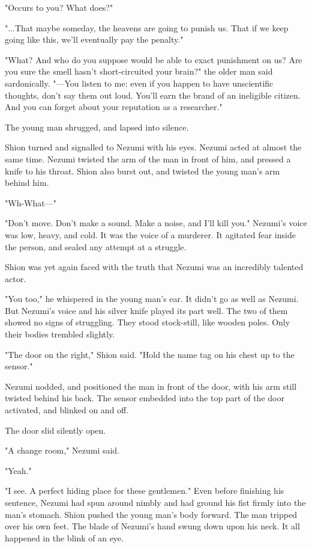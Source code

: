 "Occurs to you? What does?"

"...That maybe someday, the heavens are going to punish us. That if we
keep going like this, we'll eventually pay the penalty."

"What? And who do you suppose would be able to exact punishment on us?
Are you sure the smell hasn't short-circuited your brain?" the older man
said sardonically. "---You listen to me: even if you happen to have
unscientific thoughts, don't say them out loud. You'll earn the brand of
an ineligible citizen. And you can forget about your reputation as a
researcher."

The young man shrugged, and lapsed into silence.

Shion turned and signalled to Nezumi with his eyes. Nezumi acted at
almost the same time. Nezumi twisted the arm of the man in front of him,
and pressed a knife to his throat. Shion also burst out, and twisted the
young man's arm behind him.

"Wh-What---"

"Don't move. Don't make a sound. Make a noise, and I'll kill you."
Nezumi's voice was low, heavy, and cold. It was the voice of a murderer.
It agitated fear inside the person, and sealed any attempt at a
struggle.

Shion was yet again faced with the truth that Nezumi was an incredibly
talented actor.

"You too," he whispered in the young man's ear. It didn't go as well as
Nezumi. But Nezumi's voice and his silver knife played its part well.
The two of them showed no signs of struggling. They stood stock-still,
like wooden poles. Only their bodies trembled slightly.

"The door on the right," Shion said. "Hold the name tag on his chest up
to the sensor."

Nezumi nodded, and positioned the man in front of the door, with his arm
still twisted behind his back. The sensor embedded into the top part of
the door activated, and blinked on and off.

The door slid silently open.

"A change room," Nezumi said.

"Yeah."

"I see. A perfect hiding place for these gentlemen." Even before
finishing his sentence, Nezumi had spun around nimbly and had ground his
fist firmly into the man's stomach. Shion pushed the young man's body
forward. The man tripped over his own feet. The blade of Nezumi's hand
swung down upon his neck. It all happened in the blink of an eye.

